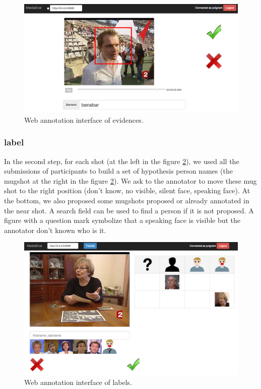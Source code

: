 \documentclass{acm_proc_article-me}
\begin{document}
\begin{figure}[htb]
 \center 
 \includegraphics[width=0.8\linewidth]{figs/evidence_interface.png}
 \centering
 \caption {Web annotation interface of evidences.}
 \label{fig:evidence}
\end{figure}

\subsubsection{label}

In the second step, for each shot (at the left in the figure \ref{fig:label}), we used all the submissions of participants to build a set of hypothesis person names (the mugshot at the right in the figure \ref{fig:label}). We ask to the annotator to move these mug shot to the right position (don't know, no visible, silent face, speaking face). At the bottom, we also proposed some mugshots proposed or already annotated in the near shot. A search field can be used to find a person if it is not proposed. A figure with a question mark symbolize that a speaking face is visible but the annotator don't known who is it.

\begin{figure}[htb]
 \center 
 \includegraphics[width=0.8\linewidth]{figs/label_interface.png}
 \centering
 \caption {Web annotation interface of labels.}
 \label{fig:label}
\end{figure}
\end{document}
